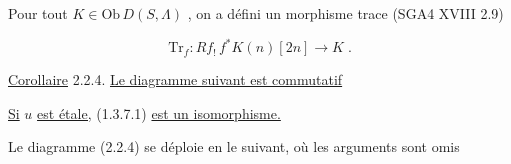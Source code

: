 Pour tout $K \in \mathrm{Ob}\, D(S, \Lambda)$ , on a défini un morphisme trace (SGA4 XVIII 2.9)

\begin{equation*}
\mathrm{Tr}_f : Rf_! \, f^* K(n) [2n] \longrightarrow K \; .
\end{equation*}

\underline{Corollaire} 2.2.4. \underline{Le diagramme suivant est commutatif}

\begin{center}
\end{center}
\underline{Si} $u$ \underline{est étale,} (1.3.7.1) \underline{est un isomorphisme.}

Le diagramme (2.2.4) se déploie en le suivant, où les arguments sont omis

